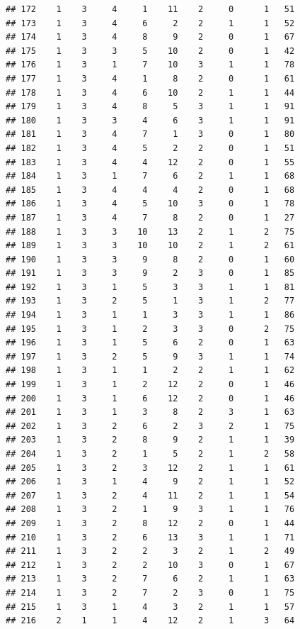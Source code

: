 \documentclass[krantz2,ChapterTOCs]{krantz}\usepackage{knitr}
\begin{document}
\begin{knitrout}
\begin{kframe}
\begin{verbatim}
## 172    1    3     4     1    11    2     0      1   51
## 173    1    3     4     6     2    2     1      1   52
## 174    1    3     4     8     9    2     0      1   67
## 175    1    3     3     5    10    2     0      1   42
## 176    1    3     1     7    10    3     1      1   78
## 177    1    3     4     1     8    2     0      1   61
## 178    1    3     4     6    10    2     1      1   44
## 179    1    3     4     8     5    3     1      1   91
## 180    1    3     3     4     6    3     1      1   91
## 181    1    3     4     7     1    3     0      1   80
## 182    1    3     4     5     2    2     0      1   51
## 183    1    3     4     4    12    2     0      1   55
## 184    1    3     1     7     6    2     1      1   68
## 185    1    3     4     4     4    2     0      1   68
## 186    1    3     4     5    10    3     0      1   78
## 187    1    3     4     7     8    2     0      1   27
## 188    1    3     3    10    13    2     1      2   75
## 189    1    3     3    10    10    2     1      2   61
## 190    1    3     3     9     8    2     0      1   60
## 191    1    3     3     9     2    3     0      1   85
## 192    1    3     1     5     3    3     1      1   81
## 193    1    3     2     5     1    3     1      2   77
## 194    1    3     1     1     3    3     1      1   86
## 195    1    3     1     2     3    3     0      2   75
## 196    1    3     1     5     6    2     0      1   63
## 197    1    3     2     5     9    3     1      1   74
## 198    1    3     1     1     2    2     1      1   62
## 199    1    3     1     2    12    2     0      1   46
## 200    1    3     1     6    12    2     0      1   46
## 201    1    3     1     3     8    2     3      1   63
## 202    1    3     2     6     2    3     2      1   75
## 203    1    3     2     8     9    2     1      1   39
## 204    1    3     2     1     5    2     1      2   58
## 205    1    3     2     3    12    2     1      1   61
## 206    1    3     1     4     9    2     1      1   52
## 207    1    3     2     4    11    2     1      1   54
## 208    1    3     2     1     9    3     1      1   76
## 209    1    3     2     8    12    2     0      1   44
## 210    1    3     2     6    13    3     1      1   71
## 211    1    3     2     2     3    2     1      2   49
## 212    1    3     2     2    10    3     0      1   67
## 213    1    3     2     7     6    2     1      1   63
## 214    1    3     2     7     2    3     0      1   75
## 215    1    3     1     4     3    2     1      1   57
## 216    2    1     1     4    12    2     1      3   64

\end{verbatim}
\end{kframe}
\end{knitrout}
\end{document}
